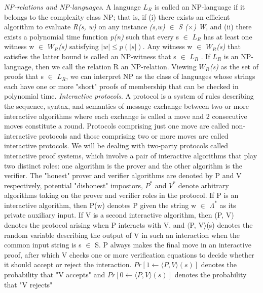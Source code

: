 \documentclass[a4paper]{article}
\begin{document}
\newline
\textit{NP-relations and NP-languages}. A language \textit{$L_R$} is called an NP-language if it belongs to the complexity class NP; that is, if (i) there exists an efficient algorithm to evaluate \textit{R(s, w)} on any instance \textit{(s,w)} $\in$ \textit{S ($\times$) W}, and (ii) there exists a polynomial time function \emph{p(n)} such that every s $\in$ \textit{$L_R$} has at least one witness w $\in$ \textit{$W_R$(s)} satisfying $|w|\leq p(|s|)$.
Any witness w $\in$ \textit{$W_R$(s)} that satisfies the latter bound is called an NP-witness that s $\in$ \textit{$L_R$} . If \textit{$L_R$} is an NP-language, then we call the relation R an NP-relation. Viewing \textit{$W_R$(s)} as the set of proofs that s $\in$ \textit{$L_R$}, we can interpret NP as the class of languages whose strings each have one or more "short" proofs of membership that can be checked in polynomial time.
\newline
\newline
\textit{Interactive protocols}. A protocol is a system of rules describing the sequence, syntax, and semantics of message exchange between two or more interactive algorithms where each exchange is called a move and 2 consecutive moves constitute a round. Protocols comprising just one move are called non-interactive protocols and those comprising two or more moves are called interactive protocols. We will be dealing with two-party protocols called interactive proof systems, which involve a pair of interactive algorithms that play two distinct roles: one algorithm is the prover and the other algorithm is the verifier. The "honest" prover and verifier algorithms are denoted by P and V respectively, potential "dishonest" impostors, \textit{$P^{*}$} and \textit{$V^{*}$} denote arbitrary algorithms taking on the prover and verifier roles in the protocol. If P is an interactive algorithm, then P(w) denotes P given the string w $\in$ \(\Lambda^{*}\) as its private auxiliary input. If V is a second interactive algorithm, then (P, V) denotes the protocol arising when P interacts with V, and $\langle$P, V$\rangle$(s) denotes the random variable describing the output of V in such an interaction when the common input string is s $\in$ S. P always makes the final move in an interactive proof, after which V checks one or more verification equations to decide whether it should accept or reject the interaction. $Pr[1 \gets \langle P, V \rangle (s)]$ denotes the probability that "V accepts" and $Pr[0 \gets \langle P, V \rangle (s)]$ denotes the probability that "V rejects"
\end{document}
